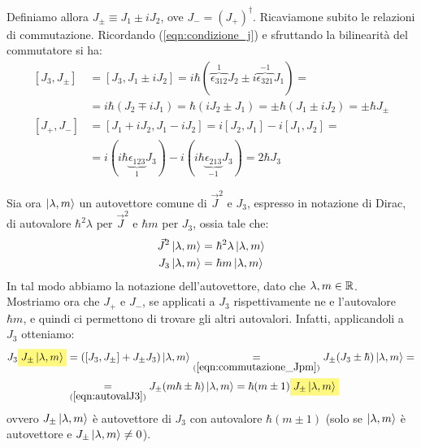 \documentclass[../../FisicaTeorica.tex]{subfiles}
\begin{document}
Definiamo allora $J_{\pm} \equiv J_1 \pm i J_2$, ove $J_- = (J_+)^\dag$. Ricaviamone subito le relazioni di commutazione. Ricordando (\ref{eqn:condizione_j}) e sfruttando la bilinearità del commutatore si ha:
\begin{align}\nonumber
[J_3, J_{\pm}] &= [J_3, J_1 \pm i J_2] = i\hbar (\overbrace{\epsilon_{312}}^{1} J_2 \pm i\overbrace{ \epsilon_{321}}^{-1}J_1) =\\
&=i\hbar (J_2 \mp iJ_1) = \hbar (i J_2 \pm J_1) = \pm \hbar(J_1 \pm i J_2) = \pm \hbar J_\pm
\label{eqn:commutazione_Jpm}
\\
[J_+, J_-] &= [J_1 + iJ_2, J_1 - iJ_2]=i[J_2, J_1]-i[J_1,J_2]=\\
&= i(i\hbar\underbrace{\epsilon_{123}}_{1}J_3) -i(i\hbar\underbrace{ \epsilon_{213}}_{-1}J_3)=
2\hbar J_3 \nonumber
\end{align}

Sia ora $\Ket{\lambda,m}$ un autovettore comune di $\vec{J}^2$ e $J_3$, espresso in notazione di Dirac, di autovalore $\hbar^2 \lambda$ per $\vec{J}^2$ e $\hbar m$ per $J_3$, ossia tale che:
\begin{align}
\vec{J}^2 \Ket{\lambda,m} &= \hbar^2 \lambda \Ket{\lambda,m}
\label{eqn:autovalJquadro}
\\
J_3 \Ket{\lambda,m} &=\hbar m \Ket{\lambda,m} 
\label{eqn:autovalJ3}
\end{align}
In tal modo abbiamo  la notazione dell'autovettore, dato che $\lambda, m \in \mathbb{R}$.\\
Mostriamo ora che $J_+$ e $J_-$, se applicati a $J_3$ rispettivamente ne  e  l'autovalore $\hbar m$, e quindi ci permettono di trovare gli altri autovalori. Infatti, applicandoli a $J_3$ otteniamo:
\begin{align}\nonumber
J_3 \hlc{Yellow}{J_{\pm} \ket{\lambda,m}} &= ([J_3,J_\pm]+J_\pm J_3)\ket{\lambda,m} \underset{(\ref{eqn:commutazione_Jpm})}{=}
J_\pm (J_3 \pm \hbar) \ket{\lambda, m} = \\
&\underset{(\ref{eqn:autovalJ3})}{=} J_\pm (m\hbar \pm \hbar) \ket{\lambda,m} = \hbar(m\pm 1)\hlc{Yellow}{ J_{\pm}\ket{\lambda,m}} \label{eqn:autovalore_aumentato}
\end{align}
ovvero $J_\pm\Ket{\lambda,m}$ è autovettore di $J_3$ con autovalore $\hbar(m\pm 1)$ (solo se $\Ket{\lambda,m}$ è autovettore e $J_\pm \Ket{\lambda,m}\neq 0$).\\ %
\end{document}
